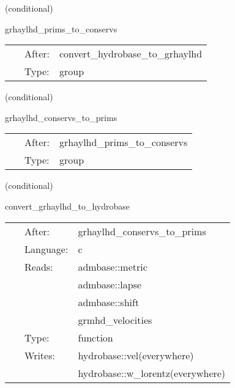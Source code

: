 \vspace{5mm}

   (conditional) 

\hspace{5mm} grhaylhd\_prims\_to\_conservs 

\hspace{5mm}{\it compute conservative variables from primitives } 


\hspace{5mm}

 \begin{tabular*}{160mm}{cll} 
~ & After:  & convert\_hydrobase\_to\_grhaylhd \\ 
~ & Type:  & group \\ 
\end{tabular*} 


\vspace{5mm}

   (conditional) 

\hspace{5mm} grhaylhd\_conservs\_to\_prims 

\hspace{5mm}{\it compute primitive variables from conservatives } 


\hspace{5mm}

 \begin{tabular*}{160mm}{cll} 
~ & After:  & grhaylhd\_prims\_to\_conservs \\ 
~ & Type:  & group \\ 
\end{tabular*} 


\vspace{5mm}

   (conditional) 

\hspace{5mm} convert\_grhaylhd\_to\_hydrobase 

\hspace{5mm}{\it convert grhaylhd-native variables to hydrobase } 


\hspace{5mm}

 \begin{tabular*}{160mm}{cll} 
~ & After:  & grhaylhd\_conservs\_to\_prims \\ 
~ & Language:  & c \\ 
~ & Reads:  & admbase::metric \\ 
~& ~ &admbase::lapse\\ 
~& ~ &admbase::shift\\ 
~& ~ &grmhd\_velocities\\ 
~ & Type:  & function \\ 
~ & Writes:  & hydrobase::vel(everywhere) \\ 
~& ~ &hydrobase::w\_lorentz(everywhere)\\ 
\end{tabular*} 


